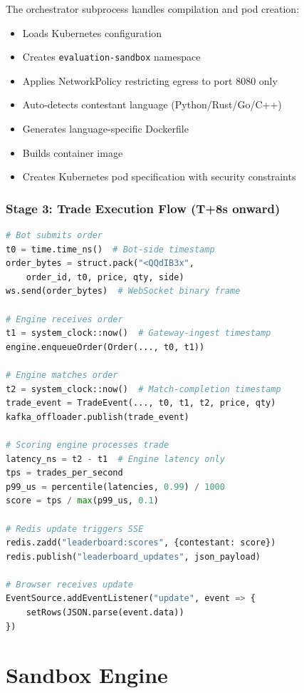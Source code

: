 \documentclass[10pt,a4paper,oneside]{report}
\begin{document}
The orchestrator subprocess handles compilation and pod creation:

\begin{itemize}
    \item Loads Kubernetes configuration
    \item Creates \texttt{evaluation-sandbox} namespace
    \item Applies NetworkPolicy restricting egress to port 8080 only
    \item Auto-detects contestant language (Python/Rust/Go/C++)
    \item Generates language-specific Dockerfile
    \item Builds container image
    \item Creates Kubernetes pod specification with security constraints
\end{itemize}

\subsection{Stage 3: Trade Execution Flow (T+8s onward)}

\begin{lstlisting}[language=python]
# Bot submits order
t0 = time.time_ns()  # Bot-side timestamp
order_bytes = struct.pack("<QQdIB3x",
    order_id, t0, price, qty, side)
ws.send(order_bytes)  # WebSocket binary frame

# Engine receives order
t1 = system_clock::now()  # Gateway-ingest timestamp
engine.enqueueOrder(Order(..., t0, t1))

# Engine matches order
t2 = system_clock::now()  # Match-completion timestamp
trade_event = TradeEvent(..., t0, t1, t2, price, qty)
kafka_offloader.publish(trade_event)

# Scoring engine processes trade
latency_ns = t2 - t1  # Engine latency only
tps = trades_per_second
p99_us = percentile(latencies, 0.99) / 1000
score = tps / max(p99_us, 0.1)

# Redis update triggers SSE
redis.zadd("leaderboard:scores", {contestant: score})
redis.publish("leaderboard_updates", json_payload)

# Browser receives update
EventSource.addEventListener("update", event => {
    setRows(JSON.parse(event.data))
})
\end{lstlisting}

\chapter{Sandbox Engine}
\end{document}
